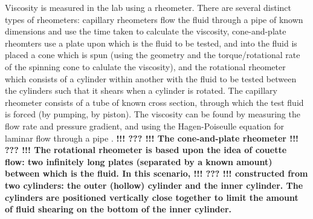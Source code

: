 \documentclass[twoside,a4]{report}
\def\br{\newline \newline \noindent}
\def\cbh{\large\bfseries !!! ??? !!! \normalsize\normalfont}
\begin{document}
	Viscosity is measured in the lab using a rheometer. There are several distinct types of rheometers: capillary rheometers flow the fluid through a pipe of known dimensions and use the time taken to calculate the viscosity, cone-and-plate rheomters use a plate upon which is the fluid to be tested, and into the fluid is placed a cone which is spun (using the geometry and the torque/rotational rate of the spinning cone to calulate the viscosity), and the rotational rheometer which consists of a cylinder within another with the fluid to be tested between the cylinders such that it shears when a cylinder is rotated. \br
	The capillary rheometer consists of a tube of known cross section, through which the test fluid is forced (by pumping, by piston). The viscosity can be found by measuring the flow rate and pressure gradient, and using the Hagen-Poiseulle equation for laminar flow through a pipe \cite{backcaprheom}. \cbh \br %
	The cone-and-plate rheometer \cbh \br %
	The rotational rheometer is based upon the idea of couette flow: two infinitely long plates (separated by a known amount) between which is the fluid. In this scenario, \cbh
	constructed from two cylinders: the outer (hollow) cylinder and the inner cylinder. The cylinders are positioned vertically close together to limit the amount of fluid shearing on the bottom of the inner cylinder.
	
\end{document}
